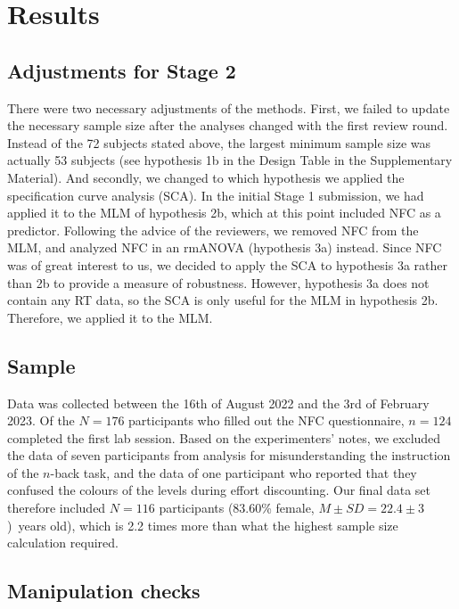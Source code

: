 \documentclass[
  man,floatsintext]{apa6}
\begin{document}
\hypertarget{results}{%
\section{Results}\label{results}}

\hypertarget{adjustments-for-stage-2}{%
\subsection{Adjustments for Stage 2}\label{adjustments-for-stage-2}}

There were two necessary adjustments of the methods.
First, we failed to update the necessary sample size after the analyses changed with the first review round.
Instead of the 72 subjects stated above, the largest minimum sample size was actually 53 subjects (see hypothesis 1b in the Design Table in the Supplementary Material).
And secondly, we changed to which hypothesis we applied the specification curve analysis (SCA).
In the initial Stage 1 submission, we had applied it to the MLM of hypothesis 2b, which at this point included NFC as a predictor.
Following the advice of the reviewers, we removed NFC from the MLM, and analyzed NFC in an rmANOVA (hypothesis 3a) instead.
Since NFC was of great interest to us, we decided to apply the SCA to hypothesis 3a rather than 2b to provide a measure of robustness.
However, hypothesis 3a does not contain any RT data, so the SCA is only useful for the MLM in hypothesis 2b.
Therefore, we applied it to the MLM.

\hypertarget{sample}{%
\subsection{Sample}\label{sample}}

Data was collected between the 16th of August 2022 and the 3rd of February 2023.
Of the \(N=176\) participants who filled out the NFC questionnaire, \(n=124\) completed the first lab session.
Based on the experimenters' notes, we excluded the data of seven participants from analysis for misunderstanding the instruction of the \(n\)-back task, and the data of one participant who reported that they confused the colours of the levels during effort discounting.
Our final data set therefore included \(N=116\) participants (83.60\% female, \(M \pm SD=22.4 \pm 3\))~years old), which is 2.2 times more than what the highest sample size calculation required.

\hypertarget{manipulation-checks}{%
\subsection{Manipulation checks}\label{manipulation-checks}}
\end{document}

